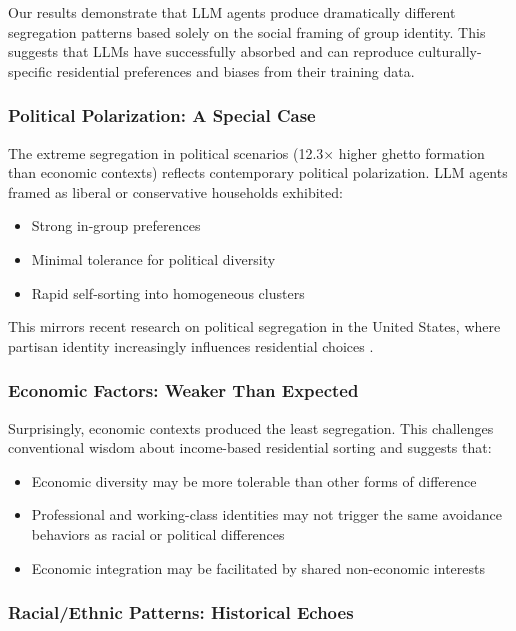 \documentclass[pdflatex,sn-basic]{sn-jnl}%
\begin{document}
Our results demonstrate that LLM agents produce dramatically different
segregation patterns based solely on the social framing of group
identity. This suggests that LLMs have successfully absorbed and can
reproduce culturally-specific residential preferences and biases from
their training data.

\subsubsection{Political Polarization: A Special
Case}\label{political-polarization-a-special-case}

The extreme segregation in political scenarios (12.3× higher ghetto
formation than economic contexts) reflects contemporary political
polarization. LLM agents framed as liberal or conservative households
exhibited: 
\begin{itemize}
\item Strong in-group preferences 
\item Minimal tolerance for
political diversity 
\item Rapid self-sorting into homogeneous clusters
\end{itemize}

This mirrors recent research on political segregation in the United
States, where partisan identity increasingly influences residential
choices \citep{brown2021geography}.

\subsubsection{Economic Factors: Weaker Than
Expected}\label{economic-factors-weaker-than-expected}

Surprisingly, economic contexts produced the least segregation. This
challenges conventional wisdom about income-based residential sorting
and suggests that: 
\begin{itemize}
\item Economic diversity may be more tolerable than other
forms of difference 
\item Professional and working-class identities may not
trigger the same avoidance behaviors as racial or political differences
\item Economic integration may be facilitated by shared non-economic
interests
\end{itemize}

\subsubsection{Racial/Ethnic Patterns: Historical
Echoes}\label{racial-ethnic-patterns-historical-echoes}
\end{document}
